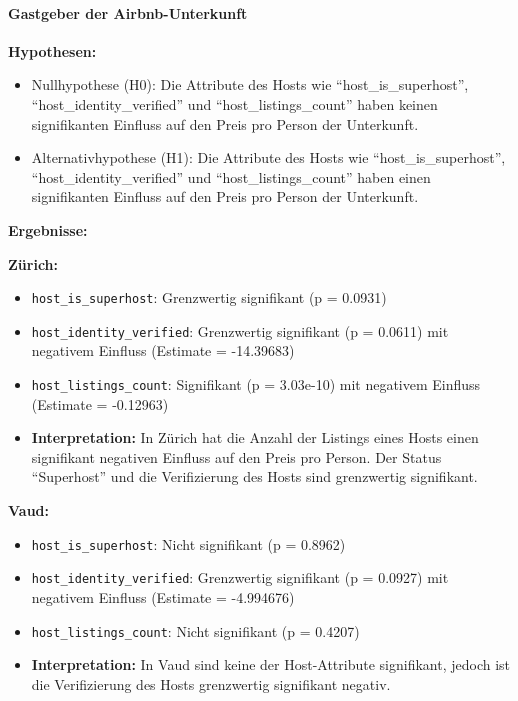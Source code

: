 \documentclass[
  journal,
]{IEEEtran}%
\let\oldparagraph\paragraph
\renewcommand{\paragraph}[1]{\oldparagraph{#1}\mbox{}}
\providecommand{\tightlist}{%
  \setlength{\itemsep}{0pt}\setlength{\parskip}{0pt}}\usepackage{longtable,booktabs,array}
\begin{document}
\hypertarget{gastgeber-der-airbnb-unterkunft}{%
\paragraph{Gastgeber der
Airbnb-Unterkunft}\label{gastgeber-der-airbnb-unterkunft}}

\textbf{Hypothesen:}

\begin{itemize}
\tightlist
\item
  Nullhypothese (H0): Die Attribute des Hosts wie
  ``host\_is\_superhost'', ``host\_identity\_verified'' und
  ``host\_listings\_count'' haben keinen signifikanten Einfluss auf den
  Preis pro Person der Unterkunft.
\item
  Alternativhypothese (H1): Die Attribute des Hosts wie
  ``host\_is\_superhost'', ``host\_identity\_verified'' und
  ``host\_listings\_count'' haben einen signifikanten Einfluss auf den
  Preis pro Person der Unterkunft.
\end{itemize}

\textbf{Ergebnisse:}

\textbf{Zürich:}

\begin{itemize}
\item
  \texttt{host\_is\_superhost}: Grenzwertig signifikant (p = 0.0931)
\item
  \texttt{host\_identity\_verified}: Grenzwertig signifikant (p =
  0.0611) mit negativem Einfluss (Estimate = -14.39683)
\item
  \texttt{host\_listings\_count}: Signifikant (p = 3.03e-10) mit
  negativem Einfluss (Estimate = -0.12963)
\item
  \textbf{Interpretation:} In Zürich hat die Anzahl der Listings eines
  Hosts einen signifikant negativen Einfluss auf den Preis pro Person.
  Der Status ``Superhost'' und die Verifizierung des Hosts sind
  grenzwertig signifikant.
\end{itemize}

\textbf{Vaud:}

\begin{itemize}
\item
  \texttt{host\_is\_superhost}: Nicht signifikant (p = 0.8962)
\item
  \texttt{host\_identity\_verified}: Grenzwertig signifikant (p =
  0.0927) mit negativem Einfluss (Estimate = -4.994676)
\item
  \texttt{host\_listings\_count}: Nicht signifikant (p = 0.4207)
\item
  \textbf{Interpretation:} In Vaud sind keine der Host-Attribute
  signifikant, jedoch ist die Verifizierung des Hosts grenzwertig
  signifikant negativ.
\end{itemize}
\end{document}
